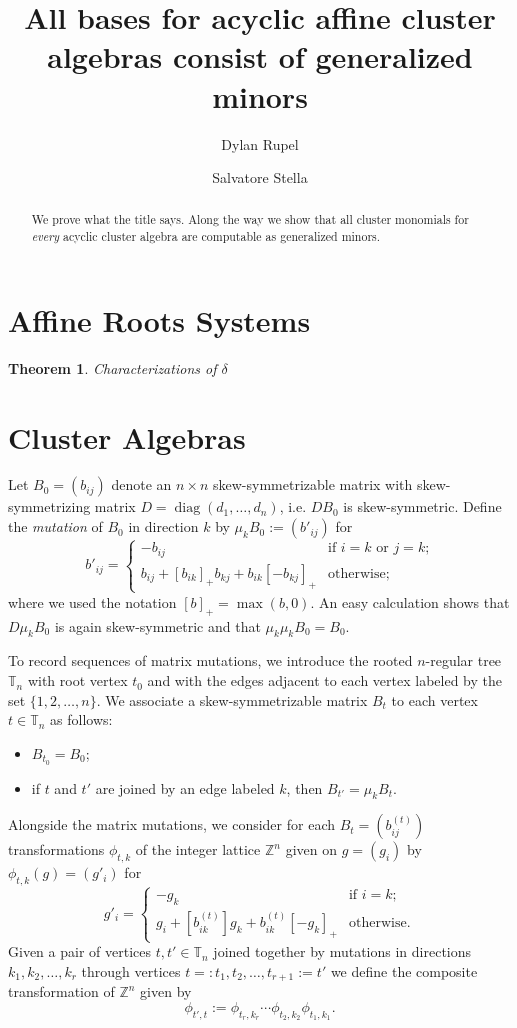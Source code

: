 \documentclass{amsart}
\title{All bases for acyclic affine cluster algebras consist of generalized minors}
\author{Dylan Rupel}
\author{Salvatore Stella}
\newtheorem{theorem}{Theorem}
\newcommand{\diag}{\operatorname{diag}}
\newcommand{\TT}{\mathbb{T}}
\newcommand{\ZZ}{\mathbb{Z}}
\begin{document}
  \begin{abstract}
    We prove what the title says.
    Along the way we show that all cluster monomials for \emph{every} acyclic cluster algebra are computable as generalized minors.
  \end{abstract}
  \maketitle

  \section{Affine Roots Systems}
    \begin{theorem}
      Characterizations of $\delta$
    \end{theorem}

  \section{Cluster Algebras}
    Let $B_0=(b_{ij})$ denote an $n\times n$ skew-symmetrizable matrix with skew-symmetrizing matrix $D=\diag(d_1,\ldots,d_n)$, i.e. $DB_0$ is skew-symmetric.
    Define the \emph{mutation} of $B_0$ in direction $k$ by $\mu_k B_0:=(b'_{ij})$ for
    \[b'_{ij}=\begin{cases} -b_{ij} & \text{if $i=k$ or $j=k$;}\\ b_{ij}+[b_{ik}]_+b_{kj}+b_{ik}[-b_{kj}]_+ & \text{otherwise;}\end{cases}\]
    where we used the notation $[b]_+=\max(b,0)$.
    An easy calculation shows that $D\mu_k B_0$ is again skew-symmetric and that $\mu_k \mu_k B_0 = B_0$.

    To record sequences of matrix mutations, we introduce the rooted $n$-regular tree $\TT_n$ with root vertex $t_0$ and with the edges adjacent to each vertex labeled by the set $\{1,2,\ldots,n\}$.
    We associate a skew-symmetrizable matrix $B_t$ to each vertex $t\in\TT_n$ as follows:
    \begin{itemize}
      \item $B_{t_0}=B_0$;
      \item if $t$ and $t'$ are joined by an edge labeled $k$, then $B_{t'}=\mu_k B_t$.
    \end{itemize}

    Alongside the matrix mutations, we consider for each $B_t=(b^{(t)}_{ij})$ transformations $\phi_{t,k}$ of the integer lattice $\ZZ^n$ given on $g=(g_i)$ by $\phi_{t,k}(g)=(g'_i)$ for
    \[g'_i=\begin{cases} -g_k & \text{if $i=k$;}\\ g_i+[b^{(t)}_{ik}]g_k+b^{(t)}_{ik}[-g_k]_+ & \text{otherwise.}\end{cases}\]
    Given a pair of vertices $t,t'\in\TT_n$ joined together by mutations in directions $k_1,k_2,\ldots,k_r$ through vertices $t=:t_1,t_2,\ldots,t_{r+1}:=t'$ we define the composite transformation of $\ZZ^n$ given by
    \[\phi_{t',t}:= \phi_{t_r,k_r}\cdots \phi_{t_2,k_2}\phi_{t_1,k_1}.\]
\end{document}

